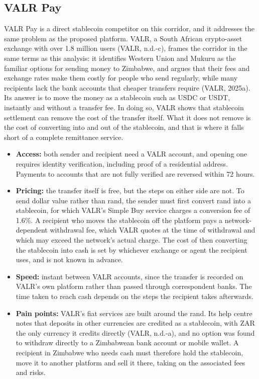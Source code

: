\documentclass[11pt,a4paper]{article}
\begin{document}
\subsection{VALR Pay}
VALR Pay is a direct stablecoin competitor on this corridor, and it addresses the same problem as the proposed platform. VALR, a South African crypto-asset exchange with over 1.8 million users (VALR, n.d.-c), frames the corridor in the same terms as this analysis: it identifies Western Union and Mukuru as the familiar options for sending money to Zimbabwe, and argues that their fees and exchange rates make them costly for people who send regularly, while many recipients lack the bank accounts that cheaper transfers require (VALR, 2025a). Its answer is to move the money as a stablecoin such as USDC or USDT, instantly and without a transfer fee. In doing so, VALR shows that stablecoin settlement can remove the cost of the transfer itself. What it does not remove is the cost of converting into and out of the stablecoin, and that is where it falls short of a complete remittance service.

\begin{itemize}
  \item \textbf{Access:} both sender and recipient need a VALR account, and opening one requires identity verification, including proof of a residential address. Payments to accounts that are not fully verified are reversed within 72 hours.
  \item \textbf{Pricing:} the transfer itself is free, but the steps on either side are not. To send dollar value rather than rand, the sender must first convert rand into a stablecoin, for which VALR's Simple Buy service charges a conversion fee of 1.6\%. A recipient who moves the stablecoin off the platform pays a network-dependent withdrawal fee, which VALR quotes at the time of withdrawal and which may exceed the network's actual charge. The cost of then converting the stablecoin into cash is set by whichever exchange or agent the recipient uses, and is not known in advance.
  \item \textbf{Speed:} instant between VALR accounts, since the transfer is recorded on VALR's own platform rather than passed through correspondent banks. The time taken to reach cash depends on the steps the recipient takes afterwards.
  \item \textbf{Pain points:} VALR's fiat services are built around the rand. Its help centre notes that deposits in other currencies are credited as a stablecoin, with ZAR the only currency it credits directly (VALR, n.d.-a), and no option was found to withdraw directly to a Zimbabwean bank account or mobile wallet. A recipient in Zimbabwe who needs cash must therefore hold the stablecoin, move it to another platform and sell it there, taking on the associated fees and risks.
\end{itemize}
\end{document}
